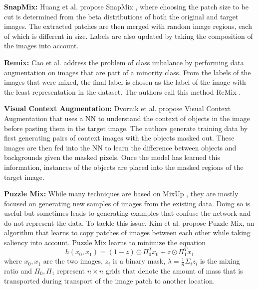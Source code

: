 \documentclass[a4paper,11pt,openright]{book}
\begin{document}
\textbf{SnapMix: }
Huang et al. propose SnapMix \cite{huangSnapMixSemanticallyProportional2021}, where choosing the patch size to be cut is determined from the beta distributions of both the original and target images. The extracted patches are then merged with random image regions, each of which is different in size. Labels are also updated by taking the composition of the images into account.

\textbf{Remix: }
Cao et al. address the problem of class imbalance by performing data augmentation on images that are part of a minority class. From the labels of the images that were mixed, the final label is chosen as the label of the image with the least representation in the dataset. The authors call this method ReMix \cite{caoReMixImagetoImageTranslation2021}.

\textbf{Visual Context Augmentation: }
Dvornik et al. propose Visual Context Augmentation \cite{dvornikModelingVisualContext2018} that uses a NN to understand the context of objects in the image before pasting them in the target image. The authors generate training data by first generating pairs of context images with the objects masked out. These images are then fed into the NN to learn the difference between objects and backgrounds given the masked pixels. Once the model has learned this information, instances of the objects are placed into the masked regions of the target image.

\textbf{Puzzle Mix: }
While many techniques are based on MixUp \cite{zhangMixupEmpiricalRisk2018}, they are mostly focused on generating new samples of images from the existing data. Doing so is useful but sometimes leads to generating examples that confuse the network and do not represent the data. To tackle this issue, Kim et al. \cite{kimPuzzleMixExploiting2020} propose Puzzle Mix, an algorithm that learns to copy patches of images between each other while taking saliency into account. Puzzle Mix learns to minimize the equation $$h(x_{0}, x_{1}) = (1-z) \odot \Pi_{0}^{T}x_{0} + z \odot \Pi_{1}^{T}x_{1}$$ where $x_{0}, x_{1}$ are the two images, $z_{i}$ is a binary mask, $\lambda = \frac{1}{n}\Sigma_{i}z_{i}$ is the mixing ratio and $\Pi_{0}, \Pi_{1}$ represent $n \times n$ grids that denote the amount of mass that is transported during transport of the image patch to another location. 
\end{document}
